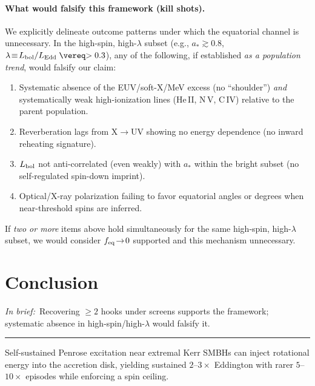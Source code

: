 \documentclass[twocolumn]{aastex701}
\DeclareRobustCommand{\tldr}[1]{%
  \noindent\textit{In brief:}~#1%
  \par\smallskip
  \noindent\rule{\columnwidth}{0.2pt}\par\medskip
}
\begin{document}

\paragraph{What would falsify this framework (kill shots).}
We explicitly delineate outcome patterns under which the equatorial channel is unnecessary. In the high-spin, high-$\lambda$ subset (e.g., $a_*\gtrsim0.8$, $\lambda\!\equiv\!L_{\rm bol}/L_{\rm Edd}\gtrsim0.3$), any of the following, if established \emph{as a population trend}, would falsify our claim:
\begin{enumerate}
\item Systematic absence of the EUV/soft-X/MeV excess (no ``shoulder'') \emph{and} systematically weak high-ionization lines (He\,II, N\,V, C\,IV) relative to the parent population.
\item Reverberation lags from X$\rightarrow$UV showing no energy dependence (no inward reheating signature).
\item $L_{\rm bol}$ not anti-correlated (even weakly) with $a_*$ within the bright subset (no self-regulated spin-down imprint).
\item Optical/X-ray polarization failing to favor equatorial angles or degrees when near-threshold spins are inferred.
\end{enumerate}
If \emph{two or more} items above hold simultaneously for the same high-spin, high-$\lambda$ subset, we would consider $f_{\rm eq}\!\to\!0$ supported and this mechanism unnecessary.

\section{Conclusion}\label{sec:conclusion}
\tldr{Recovering $\ge2$ hooks under screens supports the framework; systematic absence in high-spin/high-$\lambda$ would falsify it.}
Self-sustained Penrose excitation near extremal Kerr SMBHs can inject rotational energy into the accretion disk, yielding sustained $2$--$3\times$ Eddington with rarer $5$--$10\times$ episodes while enforcing a spin ceiling.

\clearpage
\appendix
\end{document}
